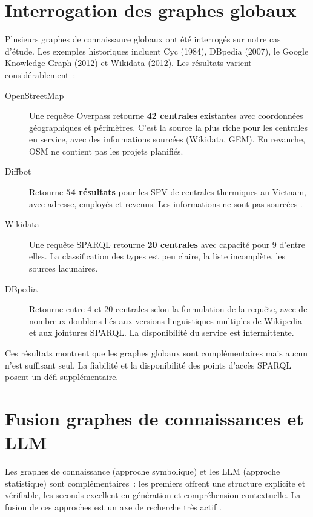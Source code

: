 \documentclass[a4paper,11pt]{report}
\begin{document}
\section{Interrogation des graphes globaux}

Plusieurs graphes de connaissance globaux ont été interrogés sur notre cas d'étude. Les exemples historiques incluent Cyc (1984), DBpedia (2007), le Google Knowledge Graph (2012) et Wikidata (2012). Les résultats varient considérablement~:

\begin{description}
\item[OpenStreetMap] Une requête Overpass retourne \textbf{42 centrales} existantes avec coordonnées géographiques et périmètres. C'est la source la plus riche pour les centrales en service, avec des informations sourcées (Wikidata, GEM). En revanche, OSM ne contient pas les projets planifiés.
\item[Diffbot] Retourne \textbf{54 résultats} pour les SPV de centrales thermiques au Vietnam, avec adresse, employés et revenus. Les informations ne sont pas sourcées \citep{U6PVXXZP}.
\item[Wikidata] Une requête SPARQL retourne \textbf{20 centrales} avec capacité pour 9 d'entre elles. La classification des types est peu claire, la liste incomplète, les sources lacunaires.
\item[DBpedia] Retourne entre 4 et 20 centrales selon la formulation de la requête, avec de nombreux doublons liés aux versions linguistiques multiples de Wikipedia et aux jointures SPARQL. La disponibilité du service est intermittente.
\end{description}

Ces résultats montrent que les graphes globaux sont complémentaires mais aucun n'est suffisant seul. La fiabilité et la disponibilité des points d'accès SPARQL posent un défi supplémentaire.

\section{Fusion graphes de connaissances et LLM}

Les graphes de connaissance (approche symbolique) et les LLM (approche statistique) sont complémentaires~: les premiers offrent une structure explicite et vérifiable, les seconds excellent en génération et compréhension contextuelle. La fusion de ces approches est un axe de recherche très actif \citep{8U2Q2H5E,8XXG9DKM,HFQGE3UK,MNQFVIVR,D7EXWP53,THNWVF3G,E42E7D4X,AZ5B27ML,TDG5RFPC,MZNGHBPG}.
\end{document}

